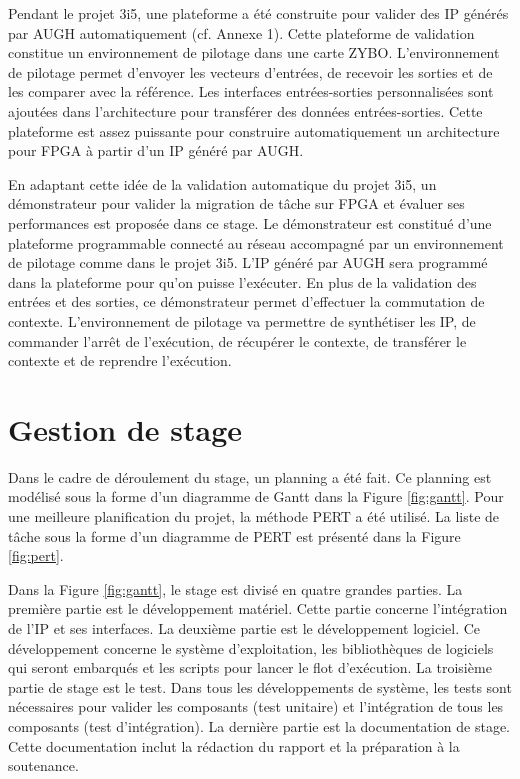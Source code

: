 Pendant le projet 3i5, une plateforme a été construite pour valider des IP générés par AUGH automatiquement\cite{Brisebard2015, Wicaksana2015} (cf. Annexe 1).
Cette plateforme de validation constitue un environnement de pilotage dans une carte ZYBO\cite{zyboweb}.
L'environnement de pilotage permet d'envoyer les
vecteurs d'entrées, de recevoir les sorties et de les comparer avec la référence.
Les interfaces entrées-sorties personnalisées sont ajoutées dans l'architecture pour transférer des données entrées-sorties.
Cette plateforme est assez puissante pour construire automatiquement un architecture pour FPGA à partir d'un IP généré par AUGH.

En adaptant cette idée de la validation automatique du projet 3i5, un démonstrateur pour valider la migration de tâche sur FPGA et évaluer ses performances
est proposée dans ce stage. Le démonstrateur est constitué d'une plateforme programmable connecté au réseau 
accompagné par un environnement de pilotage comme dans le projet 3i5. L'IP généré par AUGH sera programmé dans la plateforme
pour qu'on puisse l'exécuter.
En plus de la validation des entrées et des sorties, ce démonstrateur permet d'effectuer la commutation de contexte.
L'environnement de pilotage va permettre de synthétiser les IP, de commander l'arrêt de l'exécution, de récupérer le contexte, de
transférer le contexte et de reprendre l'exécution.

\section{Gestion de stage}
\label{sec:gestion}
\justify
Dans le cadre de déroulement du stage, un planning a été fait.
Ce planning est modélisé sous la forme d'un diagramme de Gantt dans la Figure \ref{fig:gantt}. Pour une meilleure planification du projet, 
la méthode PERT a été utilisé. La liste de tâche sous la forme d'un diagramme de PERT est présenté
dans la Figure \ref{fig:pert}.

Dans la Figure \ref{fig:gantt}, le stage est divisé en quatre grandes parties. 
La première partie est le développement matériel. Cette partie concerne 
l'intégration de l'IP et ses interfaces. La deuxième partie est le développement logiciel. Ce développement
concerne le système d'exploitation, les bibliothèques de logiciels qui seront embarqués et les scripts pour lancer le flot d'exécution.
La troisième partie de stage est le test. Dans tous les développements de système, les tests sont nécessaires
pour valider les composants (test unitaire) et l'intégration de tous les composants (test d'intégration). La dernière partie
est la documentation de stage. Cette documentation inclut la rédaction du rapport et la préparation à la soutenance.

